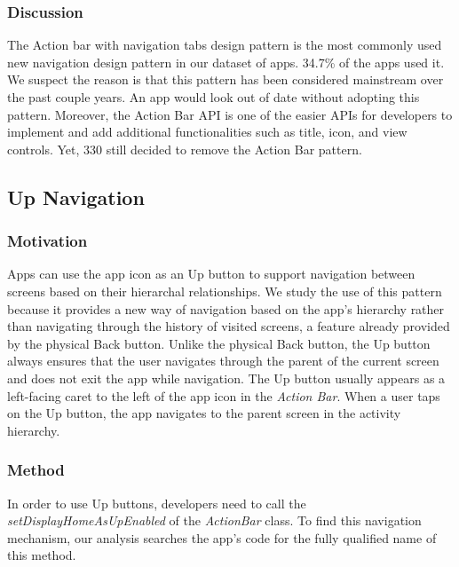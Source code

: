\subsubsection{Discussion}
The Action bar with navigation tabs design pattern is the most commonly used new navigation design pattern in our dataset of apps. 
34.7\% of the apps used it. 
We suspect the reason is that this pattern has been considered mainstream over the past couple years. 
An app would look out of date without adopting this pattern. 
Moreover, the Action Bar API is one of the easier APIs for developers to implement and add additional functionalities such as title, icon, and view controls. 
Yet, 330 still decided to remove the Action Bar pattern.

\subsection{Up Navigation}

\subsubsection{Motivation}
Apps can use the app icon as an Up button to support navigation between screens based on their hierarchal relationships. 
We study the use of this pattern because it provides a new way of navigation based on the app's hierarchy rather than navigating through the history of visited screens, a feature already provided by the physical Back button. 
Unlike the physical Back button, the Up button always ensures that the user navigates through the parent of the current screen and does not exit the app while navigation. 
The Up button usually appears as a left-facing caret to the left of the app icon in the \textit{Action Bar}. 
When a user taps on the Up button, the app navigates to the parent screen in the activity hierarchy.

\subsubsection{Method}
In order to use Up buttons, developers need to call the \textit{setDisplayHomeAsUpEnabled} of the \textit{ActionBar} class. 
To find this navigation mechanism, our analysis searches the app's code for the fully qualified name of this method.

